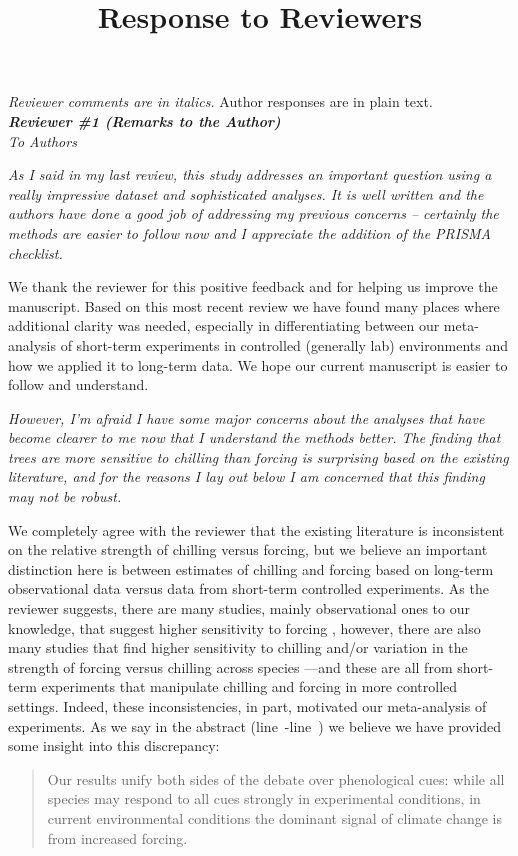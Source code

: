 \documentclass{article}
\newcommand{\lr}[1]{line~\lineref{#1}}
\begin{document}


\setlength\parindent{0pt}


\title{Response to Reviewers}
\emph{Reviewer comments are in italics.} Author responses are in plain text.\\

\emph{{\bf Reviewer \#1 (Remarks to the Author)}}\\

\emph{To Authors}

\emph{As I said in my last review, this study addresses an important question using a really impressive
dataset and sophisticated analyses. It is well written and the authors have done a good job of
addressing my previous concerns -- certainly the methods are easier to follow now and I appreciate
the addition of the PRISMA checklist.}

We thank the reviewer for this positive feedback and for helping us improve the manuscript. Based on this most recent review we have found many places where additional clarity was needed, especially in differentiating between our meta-analysis of short-term experiments in controlled (generally lab) environments and how we applied it to long-term data. We hope our current manuscript is easier to follow and understand.

\emph{However, I'm afraid I have some major concerns about the analyses that have become clearer to me
now that I understand the methods better. The finding that trees are more sensitive to chilling than
forcing is surprising based on the existing literature, and for the reasons I lay out below I am
concerned that this finding may not be robust.}

We completely agree with the reviewer that the existing literature is inconsistent on the relative strength of chilling versus forcing, but we believe an important distinction here is between estimates of chilling and forcing based on long-term observational data versus data from short-term controlled experiments. As the reviewer suggests, there are many studies, mainly observational ones to our knowledge, that suggest higher sensitivity to forcing \citep[e.g., ][]{fu2012,Rutishauser:2008},  however, there are also many studies that find higher sensitivity to chilling \citep[e.g., ][]{zohner2016, Laube:2014a,Heide:2005aa} and/or variation in the strength of forcing versus chilling across species \citep[e.g.,][]{harrington2015,Basler:2014aa,Caffarra:2011a,Caffarra:2011b,koerner2010a}---and these are all from short-term experiments that manipulate chilling and forcing in more controlled settings. Indeed, these inconsistencies, in part, motivated our meta-analysis of experiments. As we say in the abstract (\lr{unifydebatestart}-\lr{unifydebateend}) we believe we have provided some insight into this discrepancy:
\begin{quote}
Our results unify both sides of the debate over phenological cues: while all species may respond to all cues strongly in experimental conditions, in current environmental conditions the dominant signal of climate change is from increased forcing. 
\end{quote}
\end{document}
